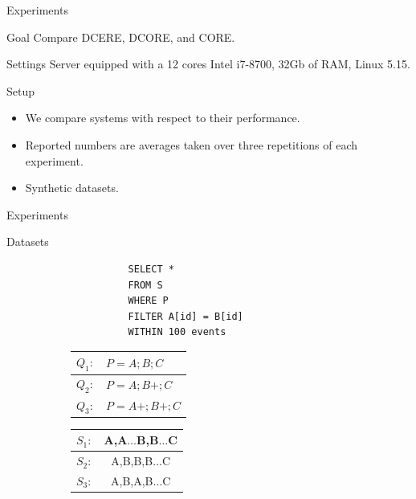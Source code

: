 \documentclass[xcolor=pdftex,dvipsnames,table]{beamer}
\begin{document}
\begin{frame}[fragile]{Experiments}
  \begin{block}{Goal}
    Compare DCERE, DCORE, and CORE.
  \end{block}
  \begin{block}{Settings}
    Server equipped with a 12 cores Intel i7-8700, 32Gb of RAM, Linux 5.15.
  \end{block}
  \begin{block}{Setup}
    \begin{itemize}
      \item We compare systems with respect to their performance.
      \item Reported numbers are averages taken over three repetitions of each experiment.
      \item Synthetic datasets.
    \end{itemize}
  \end{block}
\end{frame}

\begin{frame}[fragile]{Experiments}
  \begin{block}{Datasets}
    \begin{figure}[H]
      \centering
      \begin{subfigure}[c]{0.32\textwidth}
        \centering
        \begin{verbatim}
          SELECT *
          FROM S
          WHERE P
          FILTER A[id] = B[id]
          WITHIN 100 events
        \end{verbatim}
      \end{subfigure}
      \begin{subfigure}[t]{0.32\textwidth}
        \begin{tabular}{l l}
          \hline
          $Q_{1}:$ & $P = A;B;C$ \\
          \hline
          $Q_{2}:$ & $P = A;B+;C$ \\
          \hline
          $Q_{3}:$ & $P = A+;B+;C$ \\
          \hline
        \end{tabular}
      \end{subfigure}
      \hfill
      \begin{subfigure}[c]{0.32\textwidth}
        \centering
        \begin{tabular}{l c}
          \hline
          $S_{1}:$ & A,A$\ldots$B,B$\ldots$C\\
          \hline
          $S_{2}:$ & A,B,B,B$\ldots$C\\
          \hline
          $S_{3}:$ & A,B,A,B$\ldots$C\\
          \hline
        \end{tabular}
      \end{subfigure}
    \end{figure}
  \end{block}
\end{frame}
\end{document}
